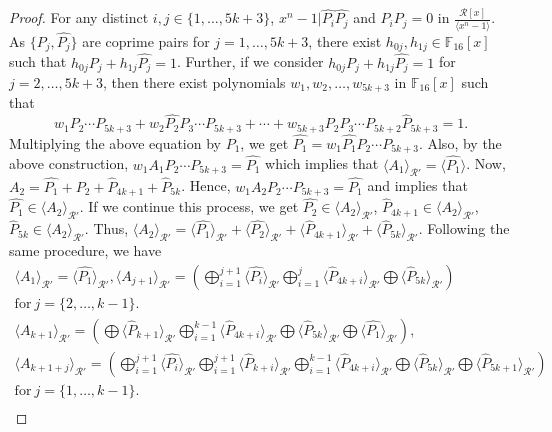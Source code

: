 \documentclass[10pt,a4paper]{amsart}
\begin{document}
\begin{proof}
    For any distinct $i,j\in \{1,\dots,5k+3\}$, $x^n-1| \hat{P_i}\hat{P_j}$ and $P_iP_j=0$ in $\frac{\mathcal{R}[x]}{\langle x^n-1 \rangle}$. As $\{P_j,\hat{P_j}\}$ are coprime pairs for $j=1,\dots,5k+3$, there exist $h_{0j},h_{1j}\in \mathbb F_{16}[x]$ such that $h_{0j}P_j+h_{1j}\hat{P_j}=1$.
		Further, if we consider $h_{0j}P_j+h_{1j}\hat{P_j}=1$ for $j=2,\dots,5k+3$, then there exist polynomials $w_1,w_2,\dots,w_{5k+3}$ in $\mathbb F_{16}[x]$ such that
		$$w_1P_2\cdots P_{5k+3}+w_2\hat{P_2}P_3\cdots P_{5k+3}+\cdots+ w_{5k+3}P_2P_3\cdots P_{5k+2} \hat{P}_{5k+3}=1.$$
	Multiplying the above equation by $\hat{P_1}$, we get
		$\hat{P_1}=w_1 \hat{P_1}P_2\cdots P_{5k+3}.$ Also, by the above construction,
        $w_1A_1P_2\cdots P_{5k+3} = \hat{P_1}$ which implies that $\langle A_1 \rangle_{\mathcal{R}'} = \langle \hat{P_{1}} \rangle $.
        Now, $A_2 = \hat{P_1} + \hat{P_2} + \hat{P}_{4k+1} + \hat{P}_{5k}$. Hence, $w_1A_2P_2\cdots P_{5k+3} = \hat{P_1}$ and implies that $\hat{P_1} \in \langle A_2 \rangle_{\mathcal{R}'}$. If we continue this process, we get $\hat{P_2} \in \langle A_2 \rangle_{\mathcal{R}'}$, $\hat{P}_{4k+1} \in \langle A_2 \rangle_{\mathcal{R}'}$, $\hat{P}_{5k} \in \langle A_2 \rangle_{\mathcal{R}'}$. Thus,
        $ \langle A_2 \rangle_{\mathcal{R}'} = \langle \hat{P_1}\rangle_{\mathcal{R}'} + \langle\hat{P_2}\rangle_{\mathcal{R}'} + \langle \hat{P}_{4k+1} \rangle_{\mathcal{R}'} + \langle \hat{P}_{5k}\rangle_{\mathcal{R}'}$.
        Following the same procedure, we have
        \allowdisplaybreaks
         \begin{gather*}
        \langle A_1 \rangle_{\mathcal{R}'} = \langle \hat{P_{1}} \rangle_{\mathcal{R}'},\langle  A_{j+1} \rangle_{\mathcal{R}'} = \left( \bigoplus_{i=1}^{j+1} \langle \hat{P_i} \rangle_{\mathcal{R}'} \bigoplus_{i=1}^{j} \langle \hat{P}_{4k+i} \rangle_{\mathcal{R}'} \bigoplus \langle \hat{P}_{5k} \rangle_{\mathcal{R}'}  \right) \\ \text{for} ~ j = \{2,\dots,k-1\}. \\
         \langle  A_{k+1} \rangle_{\mathcal{R}'} = \left( \bigoplus \langle \hat{P}_{k+1} \rangle_{\mathcal{R}'} \bigoplus_{i=1}^{k-1} \langle \hat{P}_{4k+i} \rangle_{\mathcal{R}'} \bigoplus \langle \hat{P}_{5k} \rangle_{\mathcal{R}'} \bigoplus \langle \hat{P_{1}} \rangle_{\mathcal{R}'}  \right), \\
        \langle  A_{k+1+j} \rangle_{\mathcal{R}'} = \left( \bigoplus_{i=1}^{j+1} \langle \hat{P_{i}} \rangle_{\mathcal{R}'} \bigoplus_{i=1}^{j+1} \langle \hat{P}_{k+i} \rangle_{\mathcal{R}'} \bigoplus_{i=1}^{k-1} \langle \hat{P}_{4k+i} \rangle_{\mathcal{R}'} \bigoplus \langle \hat{P}_{5k} \rangle_{\mathcal{R}'} \bigoplus \langle \hat{P}_{5k+1} \rangle_{\mathcal{R}'}  \right) \\ \text{for} ~ j = \{1,\dots,k-1\}.  \\

\end{gather*}
\end{proof}
\end{document}

